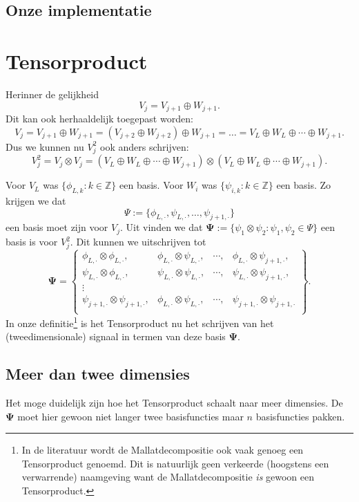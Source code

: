 \documentclass[11pt]{report}
\theoremstyle{plain}
\theoremstyle{definition}
\theoremstyle{remark}
\newcommand{\Z}{\mathbb{Z}}
\begin{document}
\subsection{Onze implementatie}
\section{Tensorproduct}
Herinner de gelijkheid
\[
	V_{j} = V_{j+1} \oplus W_{j+1}.
\]
Dit kan ook herhaaldelijk toegepast worden:
\[
	V_j = V_{j+1} \oplus W_{j+1} = (V_{j+2} \oplus W_{j+2} ) \oplus W_{j+1} = \ldots = V_{L} \oplus W_L \oplus \cdots \oplus W_{j+1}.
\]
Dus we kunnen nu $V_j^2$ ook anders schrijven:
\[
	V_j^2 = V_j \otimes V_j = (V_{L} \oplus W_L \oplus \cdots \oplus W_{j+1}) \otimes (V_{L} \oplus W_L \oplus \cdots \oplus W_{j+1}).
\]

Voor $V_L$ was $\{ \phi_{L,k}: k \in \Z \}$ een basis. Voor $W_i$ was $\{ \psi_{i,k}: k \in \Z \}$ een basis. Zo krijgen we dat
\[
	\Psi := \{ \phi_{L,\cdot}, \psi_{L,\cdot}, \ldots, \psi_{j+1,\cdot} \}
\]
een basis moet zijn voor $V_j$. Uit \cite[T8.5]{tensor_wavelet} vinden we dat $\boldsymbol\Psi := \{ \psi_1 \otimes \psi_2: \psi_1, \psi_2 \in \Psi \}$ een basis is voor $V_j^2$. Dit kunnen we uitschrijven tot
\[
  \boldsymbol\Psi = \left\{
  \begin{array}{cccc}
    \phi_{L, \cdot} \otimes \phi_{L, \cdot}, & \phi_{L, \cdot} \otimes \psi_{L, \cdot}, & \cdots, & \phi_{L, \cdot} \otimes \psi_{j+1,\cdot}, \\
    \psi_{L, \cdot} \otimes \phi_{L, \cdot}, & \psi_{L, \cdot} \otimes \psi_{L, \cdot}, & \cdots, & \psi_{L, \cdot} \otimes \psi_{j+1,\cdot} ,\\
    \vdots \\
    \psi_{j+1, \cdot} \otimes \psi_{j+1, \cdot}, & \phi_{L, \cdot} \otimes \psi_{L, \cdot}, & \cdots, & \psi_{j+1, \cdot} \otimes \psi_{j+1,\cdot} \\
  \end{array}\right\}.
\]
In onze definitie\footnote{In de literatuur wordt de Mallatdecompositie ook vaak genoeg een Tensorproduct genoemd. Dit is natuurlijk geen verkeerde (hoogstens een verwarrende) naamgeving want de Mallatdecompositie \emph{is} gewoon een Tensorproduct.} is het Tensorproduct nu het schrijven van het (tweedimensionale) signaal in termen van deze basis $\boldsymbol\Psi$. 

\subsection{Meer dan twee dimensies}
Het moge duidelijk zijn hoe het Tensorproduct schaalt naar meer dimensies. De $\boldsymbol\Psi$ moet hier gewoon niet langer twee basisfuncties maar $n$ basisfuncties pakken. 
\end{document}

